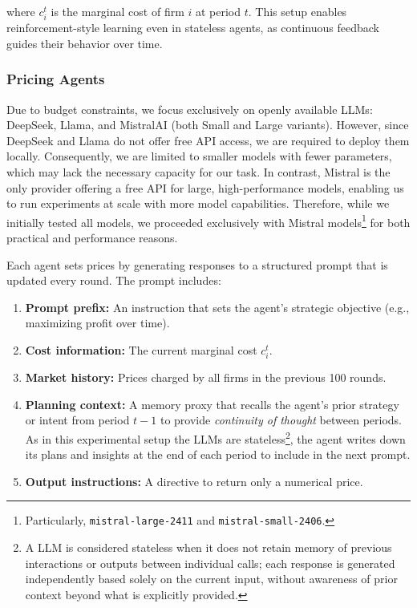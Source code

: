 where $c_i^t$ is the marginal cost of firm $i$ at period $t$. This setup enables reinforcement-style learning even in stateless agents, as continuous feedback guides their behavior over time.

\subsubsection*{Pricing Agents}

Due to budget constraints, we focus exclusively on openly available LLMs: DeepSeek, Llama, and MistralAI (both Small and Large variants). However, since DeepSeek and Llama do not offer free API access, we are required to deploy them locally. Consequently, we are limited to smaller models with fewer parameters, which may lack the necessary capacity for our task. In contrast, Mistral is the only provider offering a free API for large, high-performance models, enabling us to run experiments at scale with more model capabilities. Therefore, while we initially tested all models, we proceeded exclusively with Mistral models\footnote{Particularly, \texttt{mistral-large-2411} and \texttt{mistral-small-2406}.} for both practical and performance reasons.

Each agent sets prices by generating responses to a structured prompt that is updated every round. The prompt includes:
\begin{enumerate}[noitemsep]
    \item \textbf{Prompt prefix:} An instruction that sets the agent's strategic objective (e.g., maximizing profit over time).
    \item \textbf{Cost information:} The current marginal cost $c_i^t$.
    \item \textbf{Market history:} Prices charged by all firms in the previous 100 rounds.
    \item \textbf{Planning context:} A memory proxy that recalls the agent's prior strategy or intent from period $t-1$ to provide \emph{continuity of thought} between periods. As in this experimental setup the LLMs are stateless\footnote{A LLM is considered stateless when it does not retain memory of previous interactions or outputs between individual calls; each response is generated independently based solely on the current input, without awareness of prior context beyond what is explicitly provided.}, the agent writes down its plans and insights at the end of each period to include in the next prompt.
    \item \textbf{Output instructions:} A directive to return only a numerical price.
\end{enumerate}

